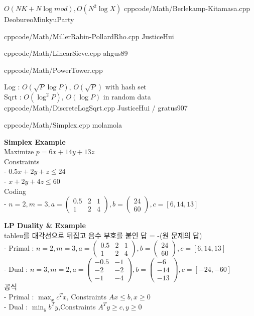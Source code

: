 \documentclass[landscape, 8pt, a4paper, oneside, twocolumn]{extarticle}
\begin{document}

{}{$O(NK + N \log mod), O(N^2 \log X)$}
{cpp}{code/Math/Berlekamp-Kitamasa.cpp}
{DeobureoMinkyuParty}

{}{}
{cpp}{code/Math/MillerRabin-PollardRho.cpp}
{JusticeHui}

{}{}
{cpp}{code/Math/LinearSieve.cpp}
{ahgus89}

{}{}
{cpp}{code/Math/PowerTower.cpp}
{}

{}{Log : $O(\sqrt P \log P)$, $O(\sqrt P)$ with hash set\\Sqrt : $O(\log^2 P)$, $O(\log P)$ in random data}
{cpp}{code/Math/DiscreteLogSqrt.cpp}
{JusticeHui / gratus907}

{}{}
{cpp}{code/Math/Simplex.cpp}
{molamola}

\noindent
\textbf{Simplex Example}\\
Maximize $p = 6x + 14y + 13z$\\
Constraints \\
- $0.5x + 2y + z \leq 24$\\
- $x + 2y + 4z \leq 60$\\
Coding\\
- $n = 2, m = 3, a = \begin{pmatrix} 0.5 & 2 & 1 \\ 1 & 2 & 4 \end{pmatrix}, b = \begin{pmatrix} 24 \\ 60 \end{pmatrix}, c = [6, 14, 13]$

\noindent
\textbf{LP Duality \& Example}\\
tableu를 대각선으로 뒤집고 음수 부호를 붙인 답 = -(원 문제의 답)\\
- Primal : $n = 2, m = 3, a = \begin{pmatrix} 0.5 & 2 & 1 \\ 1 & 2 & 4 \end{pmatrix}, b = \begin{pmatrix} 24 \\ 60 \end{pmatrix}, c = [6, 14, 13]$\\
- Dual : $n = 3, m = 2, a = \begin{pmatrix} -0.5 & -1 \\ -2 & -2 \\ -1 & -4 \end{pmatrix}, b = \begin{pmatrix} -6 \\ -14 \\ -13 \end{pmatrix}, c = [-24, -60]$\\
공식\\
- Primal : $\max_{x} c^Tx$, Constraints $Ax \leq b, x \geq 0$\\
- Dual : $\min_{y} b^Ty$,Constraints $A^Ty \geq c, y \geq 0$ 
\end{document}
